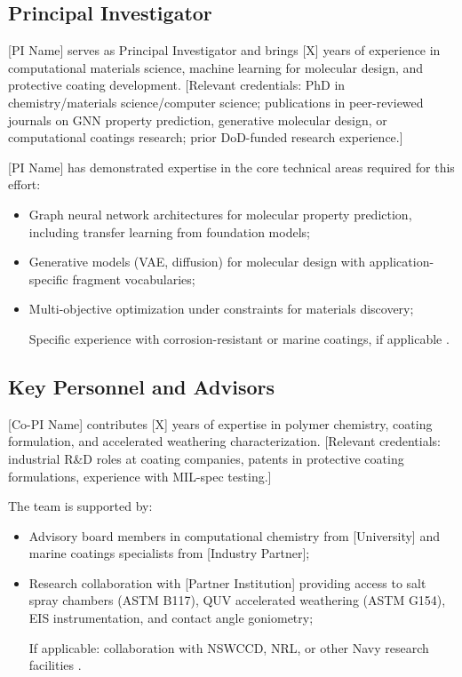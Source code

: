 \documentclass[11pt,letterpaper]{article}
\begin{document}
\subsection{Principal Investigator}

[PI Name] serves as Principal Investigator and brings [X] years of experience
in computational materials science, machine learning for molecular design, and
protective coating development. [Relevant credentials: PhD in
chemistry/materials science/computer science; publications in peer-reviewed
journals on GNN property prediction, generative molecular design, or
computational coatings research; prior DoD-funded research experience.]

[PI Name] has demonstrated expertise in the core technical areas required for
this effort:
\begin{itemize}[nosep]
  \item Graph neural network architectures for molecular property prediction,
    including transfer learning from foundation models;
  \item Generative models (VAE, diffusion) for molecular design with
    application-specific fragment vocabularies;
  \item Multi-objective optimization under constraints for materials discovery;
  \item [Specific experience with corrosion-resistant or marine coatings, if
    applicable].
\end{itemize}

\subsection{Key Personnel and Advisors}

[Co-PI Name] contributes [X] years of expertise in polymer chemistry, coating
formulation, and accelerated weathering characterization. [Relevant credentials:
industrial R\&D roles at coating companies, patents in protective coating
formulations, experience with MIL-spec testing.]

The team is supported by:
\begin{itemize}[nosep]
  \item Advisory board members in computational chemistry from [University] and
    marine coatings specialists from [Industry Partner];
  \item Research collaboration with [Partner Institution] providing access to
    salt spray chambers (ASTM B117), QUV accelerated weathering (ASTM G154),
    EIS instrumentation, and contact angle goniometry;
  \item [If applicable: collaboration with NSWCCD, NRL, or other Navy research
    facilities].
\end{itemize}
\end{document}
